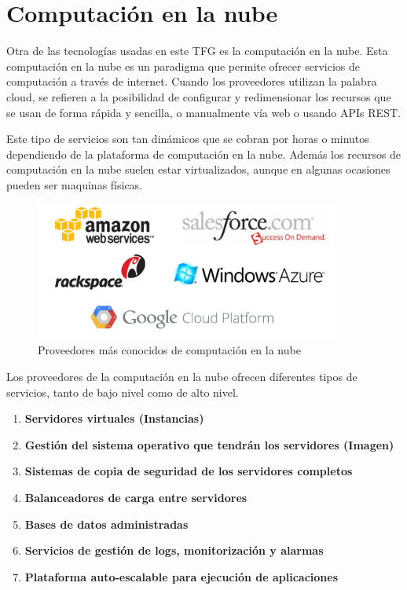 \section{Computación en la nube}
Otra de las tecnologías usadas en este TFG es la computación en la nube. Esta computación en la nube es un paradigma que permite ofrecer servicios de computación a través de internet. Cuando los proveedores utilizan la palabra cloud, se refieren a la posibilidad de configurar y redimensionar los recursos que se usan de forma rápida y sencilla, o manualmente vía web o usando APIs REST.

Este tipo de servicios son tan dinámicos que se cobran por horas o minutos dependiendo de la plataforma de computación en la nube. Además los recursos de computación en la nube suelen estar virtualizados, aunque en algunas ocasiones pueden ser maquinas físicas.
\begin{figure}[!h]
    \centering
    \includegraphics[width=100mm]{img/despliegue/proveedores.png}
    \caption{Proveedores más conocidos de computación en la nube}
\end{figure}

Los proveedores de la computación en la nube ofrecen diferentes tipos de servicios, tanto de bajo nivel como de alto nivel.

\begin{enumerate}
     \item \textbf{Servidores virtuales (Instancias)}
    \item \textbf{Gestión del sistema operativo que tendrán los servidores (Imagen)}
    \item \textbf{Sistemas de copia de seguridad de los servidores completos }
    \item \textbf{Balanceadores de carga entre servidores}
    \item \textbf{Bases de datos administradas }
    \item \textbf{Servicios de gestión de logs, monitorización y alarmas}
    \item \textbf{Plataforma auto-escalable para ejecución de aplicaciones}
\end{enumerate}

